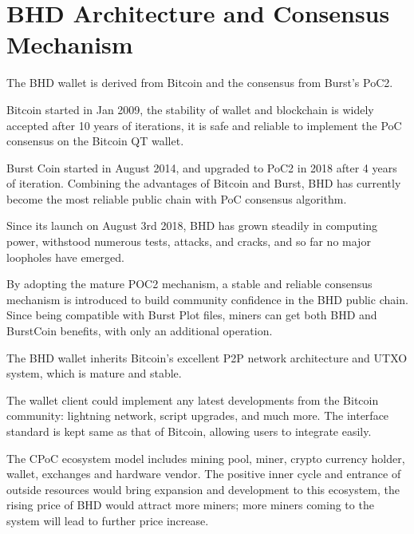 \section{BHD Architecture and Consensus Mechanism}
\begin{flushleft}
    The BHD wallet is derived from Bitcoin and the consensus from Burst's PoC2.
\end{flushleft}
\begin{flushleft}
    Bitcoin started in Jan 2009, the stability of wallet and blockchain is widely accepted after 10 years of iterations, it is safe and reliable to implement the PoC consensus on the Bitcoin QT wallet.
\end{flushleft}
\begin{flushleft}
    Burst Coin started in August 2014, and upgraded to PoC2 in 2018 after 4 years of iteration. Combining the advantages of Bitcoin and Burst, BHD has currently become the most reliable public chain with PoC consensus algorithm.
\end{flushleft}
\begin{flushleft}
    Since its launch on August 3rd 2018, BHD has grown steadily in computing power, withstood numerous tests, attacks, and cracks, and so far no major loopholes have emerged.
\end{flushleft}
\begin{flushleft}
    By adopting the mature POC2 mechanism, a stable and reliable consensus mechanism is introduced to build community confidence in the BHD public chain. Since being compatible with Burst Plot files, miners can get both BHD and BurstCoin benefits, with only an additional operation.
\end{flushleft}
\begin{flushleft}
    The BHD wallet inherits Bitcoin's excellent P2P network architecture and UTXO system, which is mature and stable.
\end{flushleft}
\begin{flushleft}
    The wallet client could implement any latest developments from the Bitcoin community: lightning network, script upgrades, and much more. The interface standard is kept same as that of Bitcoin, allowing users to integrate easily.
\end{flushleft}
\begin{flushleft}
    The CPoC ecosystem model includes mining pool, miner, crypto currency holder, wallet, exchanges and hardware vendor. The positive inner cycle and entrance of outside resources would bring expansion and development to this ecosystem, the rising price of BHD would attract more miners; more miners coming to the system will lead to further price increase.
\end{flushleft}
